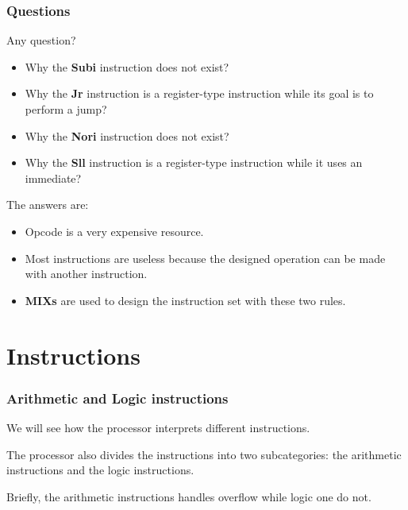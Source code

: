 
\begin{frame}
  \frametitle{Questions}

  Any question?

  \begin{itemize}[<+->]
    \item
      Why the \textbf{Subi} instruction does not exist?
    \item
      Why the \textbf{Jr} instruction is a register-type instruction
      while its goal is to perform a jump?
    \item
      Why the \textbf{Nori} instruction does not exist?
    \item
      Why the \textbf{Sll} instruction is a register-type instruction
      while it uses an immediate?
  \end{itemize}

  The answers are:

  \begin{itemize}[<+->]
    \item
      Opcode is a very expensive resource.
    \item
      Most instructions are useless because the designed operation can be
      made with another instruction.
    \item
      \textbf{MIXs} are used to design the instruction set with these
      two rules.
  \end{itemize}
\end{frame}

%
%

\section{Instructions}


\begin{frame}
  \frametitle{Arithmetic and Logic instructions}

  We will see how the processor interprets different instructions.

  \nl

  The processor also divides the instructions into two subcategories:
  the arithmetic instructions and the logic instructions.

  \nl

  Briefly, the arithmetic instructions handles overflow while logic
  one do not.
\end{frame}



